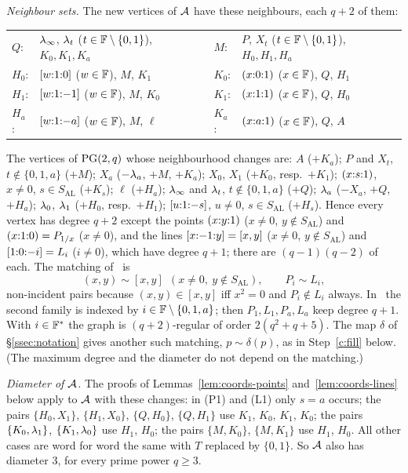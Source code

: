 \emph{Neighbour sets.} The new vertices of $\mathcal{A}$ have these neighbours, each $q+2$ of them:
\begin{center}
\begin{tabular}{@{}ll@{\qquad}ll@{}}
$Q$: & $\lambda_\infty$, $\lambda_t$ ($t \in \mathbb{F}\setminus\{0,1\}$), $K_0, K_1, K_a$ & $M$: & $P$, $X_t$ ($t \in \mathbb{F}\setminus\{0,1\}$), $H_0, H_1, H_a$\\
$H_0$: & $[{w}{:}{1}{:}{0}]$ ($w \in \mathbb{F}$), $M$, $K_1$ & $K_0$: & $({x}{:}{0}{:}{1})$ ($x \in \mathbb{F}$), $Q$, $H_1$\\
$H_1$: & $[{w}{:}{1}{:}{-1}]$ ($w \in \mathbb{F}$), $M$, $K_0$ & $K_1$: & $({x}{:}{1}{:}{1})$ ($x \in \mathbb{F}$), $Q$, $H_0$\\
$H_a$: & $[{w}{:}{1}{:}{-a}]$ ($w \in \mathbb{F}$), $M$, $\ell$ & $K_a$: & $({x}{:}{a}{:}{1})$ ($x \in \mathbb{F}$), $Q$, $A$
\end{tabular}
\end{center}
The vertices of $\mathrm{PG}(2,q)$ whose neighbourhood changes are: $A$ ($+K_a$); $P$ and $X_t$, $t \notin \{0,1,a\}$ ($+M$); $X_a$ ($-\lambda_a$, $+M$, $+K_a$); $X_0$, $X_1$ ($+K_0$, resp.\ $+K_1$); $({x}{:}{s}{:}{1})$, $x \neq 0$, $s \in S_{\mathrm{AL}}$ ($+K_s$); $\ell$ ($+H_a$); $\lambda_\infty$ and $\lambda_t$, $t \notin \{0,1,a\}$ ($+Q$); $\lambda_a$ ($-X_a$, $+Q$, $+H_a$); $\lambda_0$, $\lambda_1$ ($+H_0$, resp.\ $+H_1$); $[{u}{:}{1}{:}{-s}]$, $u \ne 0$, $s \in S_{\mathrm{AL}}$ ($+H_s$). Hence every vertex has degree $q+2$ except the points $({x}{:}{y}{:}{1})$ ($x \ne 0$, $y \notin S_{\mathrm{AL}}$) and $({x}{:}{1}{:}{0}) = P_{1/x}$ ($x \ne 0$), and the lines $[{x}{:}{-1}{:}{y}] = [x,y]$ ($x \ne 0$, $y \notin S_{\mathrm{AL}}$) and $[{1}{:}{0}{:}{-i}] = L_i$ ($i \ne 0$), which have degree $q+1$; there are $(q-1)(q-2)$ of each. The matching of~\cite{AL} is
\[
(x,y) \sim [x,y] \ \ (x \neq 0,\ y \notin S_{\mathrm{AL}}), \qquad P_i \sim L_i,
\]
non-incident pairs because $(x,y) \in [x,y]$ iff $x^2 = 0$ and $P_i \notin L_i$ always. In~\cite{AL} the second family is indexed by $i \in \mathbb{F} \setminus \{0,1,a\}$; then $P_1, L_1, P_a, L_a$ keep degree $q+1$. With $i \in \mathbb{F}^*$ the graph is $(q+2)$-regular of order $2(q^2+q+5)$. The map $\delta$ of \S\ref{ssec:notation} gives another such matching, $p \sim \delta(p)$, as in Step~\ref{c:fill} below. (The maximum degree and the diameter do not depend on the matching.)

\emph{Diameter of $\mathcal{A}$.} The proofs of Lemmas~\ref{lem:coords-points} and~\ref{lem:coords-lines} below apply to $\mathcal{A}$ with these changes: in (P1) and (L1) only $s = a$ occurs; the pairs $\{H_0, X_1\}$, $\{H_1, X_0\}$, $\{Q, H_0\}$, $\{Q, H_1\}$ use $K_1$, $K_0$, $K_1$, $K_0$; the pairs $\{K_0, \lambda_1\}$, $\{K_1, \lambda_0\}$ use $H_1$, $H_0$; the pairs $\{M, K_0\}$, $\{M, K_1\}$ use $H_1$, $H_0$. All other cases are word for word the same with $T$ replaced by $\{0,1\}$. So $\mathcal{A}$ also has diameter $3$, for every prime power $q \ge 3$.

